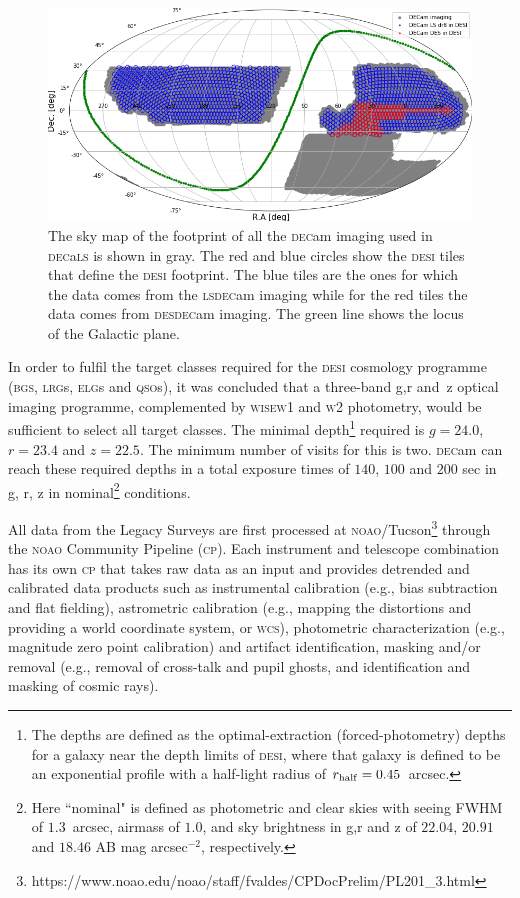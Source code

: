 \documentclass[fleqn,usenatbib]{mnras}
\newcommand{\BGS}{\textsc{bgs}\xspace}
\newcommand{\CP}{\textsc{cp}\xspace}
\newcommand{\DECam}{\textsc{dec}am\xspace}
\newcommand{\DECaLS}{\textsc{dec}a\textsc{ls}\xspace}
\newcommand{\DESI}{\textsc{desi}\xspace}
\newcommand{\DES}{\textsc{des}\xspace}
\newcommand{\ELGs}{\textsc{elg}s\xspace}
\newcommand{\LRGs}{\textsc{lrg}s\xspace}
\newcommand{\LS}{\textsc{ls}\xspace}
\newcommand{\NOAO}{\textsc{noao}\xspace}
\newcommand{\QSOs}{\textsc{qso}s\xspace}
\newcommand{\WCS}{\textsc{wcs}\xspace}
\newcommand{\WISE}{\textsc{wise}\xspace}
\newcommand{\Wone}{\textsc{w1}\xspace}
\newcommand{\Wtwo}{\textsc{w2}\xspace}
\begin{document}
\begin{figure}
	\includegraphics[width=\columnwidth]{images/decals_in_desi_footprint}
    \caption{The sky map of the footprint of all the \DECam imaging used in \DECaLS is shown in gray. The red and blue circles show the \DESI tiles that define the \DESI footprint.
    The blue tiles are the ones for which the data comes from the \LS \DECam imaging while for the red tiles the data comes from \DES \DECam imaging. The green line shows the locus of the Galactic plane.}
    \label{fig:decals_in_desi}
\end{figure}


In order to fulfil the target classes required for the \DESI cosmology programme (\BGS, \LRGs, \ELGs and \QSOs), it was concluded that a three-band g,r and~z optical imaging programme, complemented by \WISE \Wone and \Wtwo photometry, would be sufficient to select all target classes. The minimal  depth\footnote{The depths are defined as the optimal-extraction (forced-photometry) depths for a galaxy near the depth limits of \DESI, where that galaxy is defined to be an exponential profile with a half-light radius of $r_{\rm half}= 0.45$~arcsec.} required is $g=24.0$, $r=23.4$ and $z=22.5$. The minimum number of visits for this is two. \DECam can reach these required depths in a total exposure times of $140$, $100$ and $200$ sec in g, r, z in nominal\footnote{Here ``nominal" is defined as photometric and clear skies with seeing FWHM of $1.3$~arcsec, airmass of $1.0$, and sky brightness 
in g,r and z of $22.04$, $20.91$ and $18.46$ AB mag arcsec$^{-2}$, respectively.} conditions.




All data from the Legacy Surveys are first processed at \NOAO/Tucson\footnote{https://www.noao.edu/noao/staff/fvaldes/CPDocPrelim/PL201\_3.html} through the \NOAO Community Pipeline (\CP). Each instrument and telescope combination has its own \CP that takes raw data as an input and provides detrended and calibrated data products such as instrumental calibration (e.g., bias subtraction and flat fielding), astrometric calibration (e.g., mapping the distortions and providing a world coordinate system, or \WCS), photometric characterization (e.g., magnitude zero point calibration) and artifact identification, masking and/or removal (e.g., removal of cross-talk and pupil ghosts, and identification and masking of cosmic rays). 
\end{document}

